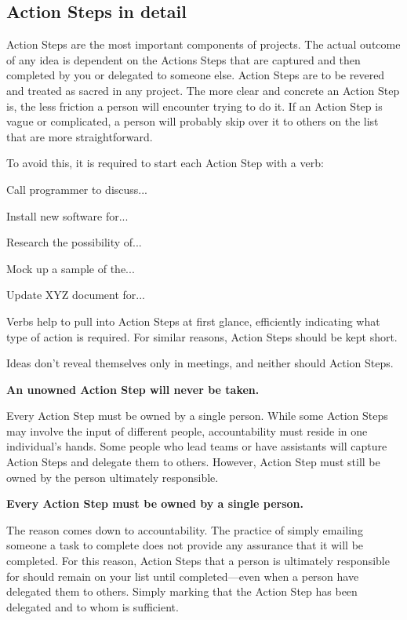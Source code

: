 \subsection{Action Steps in detail}

Action Steps are the most important components of projects. The actual outcome of any idea is dependent on the Actions Steps that are captured and then completed by you or delegated to someone else. Action Steps are to be revered and treated as sacred in any project. The more clear and concrete an Action Step is, the less friction a person will encounter trying to do it. If an Action Step is vague or complicated, a person will probably skip over it to others on the list that are more straightforward.

To avoid this, it is required to start each Action Step with a verb:
\begin{compactitem}
   \item Call programmer to discuss...
   \item Install new software for...
   \item Research the possibility of...
   \item Mock up a sample of the...
   \item Update XYZ document for...
\end{compactitem}

Verbs help to pull into Action Steps at first glance, efficiently indicating what type of action is required. For similar reasons, Action Steps should be kept short.

Ideas don’t reveal themselves only in meetings, and neither should Action Steps.

\textbf{An unowned Action Step will never be taken.}

Every Action Step must be owned by a single person. While some Action Steps may involve the input of different people, accountability must reside in one individual’s hands. Some people who lead teams or have assistants will capture Action Steps and delegate them to others. However, Action Step must still be owned by the person ultimately responsible.

\textbf{Every Action Step must be owned by a single person.}

The reason comes down to accountability. The practice of simply emailing someone a task to complete does not provide any assurance that it will be completed. For this reason, Action Steps that a person is ultimately responsible for should remain on your list until completed—even when a person have delegated them to others. Simply marking that the Action Step has been delegated and to whom is sufficient.

